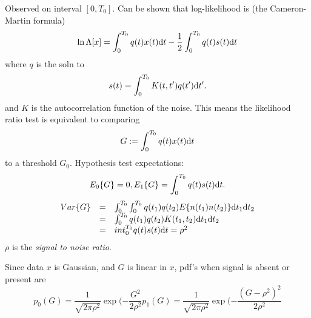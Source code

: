 Observed on interval $[0,T_0]$. Can be shown that log-likelihood is (the Cameron-Martin formula)
\begin{equation}
\label{eq:Cameron-Martin}
\ln \Lambda [x] =  \int_0^{T_0}q(t)x(t){\mbox{d}} t - \frac{1}{2}\int_0^{T_0}q(t)s(t){\mbox{d}} t
\end{equation}
where $q$ is the soln to
\begin{equation}
s(t) = \int_0^{T_0} K(t,t')q(t'){\mbox{d}} t'.
\end{equation}
and $K$ is the autocorrelation function of the noise. This means the likelihood ratio test is equivalent to comparing 
\begin{equation}
G:=\int_0^{T_0}q(t)x(t){\mbox{d}} t
\end{equation}
to a threshold $G_0$. Hypothesis test expectations:
\begin{equation}
E_0\{G\}=0,\\
E_1\{G\} = \int_0^{T_0}q(t)s(t){\mbox{d}} t.
\end{equation}
\begin{equation}
\begin{array}{rcl}
Var\{G\}&=& \int_0^{T_0}\int_0^{T_0}q(t_1)q(t_2)E\{n(t_1)n(t_2)\}{\mbox{d}} t_1  {\mbox{d}} t_2 \\
&=&\int_0^{T_0}q(t_1)q(t_2)K(t_1,t_2){\mbox{d}} t_1  {\mbox{d}} t_2\\
&=&int_0^{T_0}q(t)s(t){\mbox{d}} t = \rho^2
\end{array}
\end{equation}
$\rho$ is the \textit{signal to noise ratio}.

Since data $x$ is Gaussian, and $G$ is linear in $x$, pdf's when signal is absent or present are
\begin{equation}
p_0(G)=\frac{1}{\sqrt{2\pi\rho^2}}\exp(-\frac{G^2}{2\rho^2}
p_1(G)=\frac{1}{\sqrt{2\pi\rho^2}}\exp(-\frac{(G-\rho^2)^2}{2\rho^2}
\end{equation}



